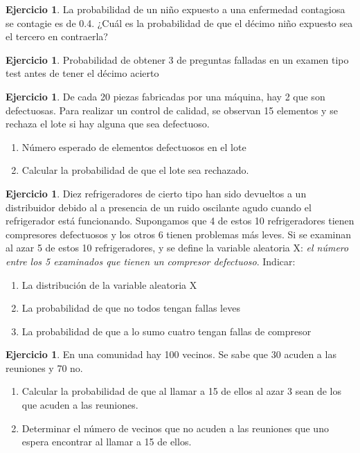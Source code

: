 \documentclass[]{article}
\providecommand{\tightlist}{%
  \setlength{\itemsep}{0pt}\setlength{\parskip}{0pt}}
\theoremstyle{plain}
\theoremstyle{definition}
\newtheorem{exercise}[theorem]{Ejercicio}
\theoremstyle{definition} %
\begin{document}
\begin{exercise}
  La probabilidad de un niño expuesto a una enfermedad contagiosa se
  contagie es de 0.4. ¿Cuál es la probabilidad de que el décimo niño
  expuesto sea el tercero en contraerla?
\end{exercise}

\begin{exercise}
  Probabilidad de obtener 3 de preguntas falladas en un examen tipo test
  antes de tener el décimo acierto 
\end{exercise}

\begin{exercise}
  De cada 20 piezas fabricadas por una máquina, hay 2 que son
  defectuosas. Para realizar un control de calidad, se observan 15
  elementos y se rechaza el lote si hay alguna que sea defectuoso. 
  
  \begin{enumerate}
    \item Número esperado de elementos defectuosos en el lote
    \item Calcular la probabilidad de que el lote sea rechazado.
  \end{enumerate}
  
\end{exercise}

\begin{exercise}
  Diez refrigeradores de cierto tipo han sido devueltos a un
  distribuidor debido al a presencia de un ruido oscilante agudo cuando
  el refrigerador está funcionando. Supongamos que 4 de estos 10
  refrigeradores tienen compresores defectuosos y los otros 6 tienen
  problemas más leves. Si se examinan al azar 5 de estos 10
  refrigeradores, y se define la variable aleatoria X: \emph{el
  número entre los 5 examinados que tienen un compresor defectuoso}.
  Indicar:

  \begin{enumerate}
  \def\labelenumii{\arabic{enumii}.}
  \tightlist
  \item
    La distribución de la variable aleatoria X
  \item
    La probabilidad de que no todos tengan fallas leves
  \item
    La probabilidad de que a lo sumo cuatro tengan fallas de compresor
  \end{enumerate}
\end{exercise}

\begin{exercise}
  En una comunidad hay 100 vecinos. Se sabe que 30 acuden a las
  reuniones y 70 no. 
  \begin{enumerate}
    \item Calcular la probabilidad de que al llamar a 15 de
    ellos al azar 3 sean de los que acuden a las reuniones.
    \item Determinar el número de vecinos que no acuden a las reuniones que uno espera encontrar 
    al llamar a 15 de ellos.
  \end{enumerate}

  
\end{exercise}
\end{document}
